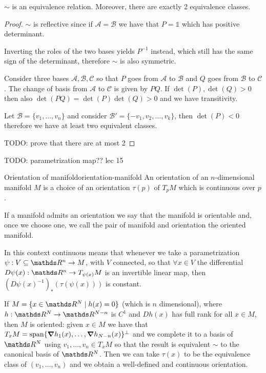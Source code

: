 \documentclass[12pt]{extarticle}
\begin{document}
\begin{proposition}{}{}
	$\sim$ is an equivalence relation. Moreover, there are exactly 2 equivalence classes.
\end{proposition}

\begin{proof}
	$\sim$ is reflective since if $\mathcal A = \mathcal B$ we have that $P = \mathds 1$ which has
	positive determinant.

	Inverting the roles of the two bases yields $P^{-1}$ instead, which still has the same sign of the
	determinant, therefore $\sim$ is also symmetric.

	Consider three bases $\mathcal A, \mathcal B, \mathcal C$ so that $P$ goes from $\mathcal A$ to
	$\mathcal B$ and $Q$ goes from $\mathcal B$ to $\mathcal C$. The change of basis from $\mathcal A$
	to $\mathcal C$ is given by $PQ$.
	If $\det (P), \det (Q) > 0$ then also $\det(PQ) = \det(P) \det(Q) > 0$ and we have transitivity.

	Let $\mathcal B = \{ v_1, \dots, v_n\}$ and consider $\mathcal B' = \{-v_1, v_2, \dots, v_k\}$,
	then $\det(P) < 0$ therefore we have at least two equivalent classes.

	TODO: prove that there are at most 2
\end{proof}

TODO: parametrization map?? lec 15

\begin{definition}{Orientation of manifold}{orientation-manifold}
	An orientation of an $n$-dimensional manifold $M$ is a choice of an orientation $\tau(p)$ of
	$T_pM$ which is continuous over $p$.

	If a manifold admits an orientation we say that the manifold is orientable and, once we choose
	one, we call the pair of manifold and orientation the oriented manifold.
\end{definition}

In this context continuous means that whenever we take a parametrization
$\psi: V \subseteq \R^n \to M$, with $V$ connected, so that $\forall x \in V$ the differential
$D\psi (x): \R^n \to T_{\psi(x)} M$ is an invertible linear map, then
$(D\psi (x)^{-1})_*(\tau(\psi(x)))$ is constant.

\begin{proposition}{}{}
	If $M = \{ x \in \R^N \mid h(x) = 0 \}$ (which is $n$ dimensional), where $h: \R^N \to \R^{N-n}$
	is $C^1$ and $Dh(x)$ has full rank for all $x \in M$, then $M$ is oriented:
	given $x \in M$ we have that
	$T_x M = \mathrm{span} \{\grad h_1(x), \dots, \grad h_{N-n}(x)\}^\perp$ and we complete it to a
	basis of $\R^N$ using $v_1, \dots, v_n \in T_xM$ so that the result is equivalent $\sim$ to the
	canonical basis of $\R^N$.
	Then we can take $\tau(x)$ to be the equivalence class of $(v_1, \dots, v_n)$ and we obtain a
	well-defined and continuous orientation.
\end{proposition}
\end{document}
